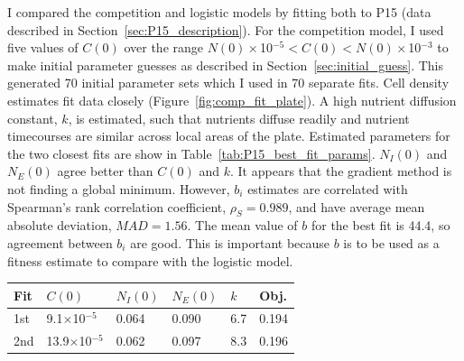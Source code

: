 I compared the competition and logistic models by fitting both to P15
(data described in Section~\ref{sec:P15_description}). For the
competition model, I used five values of \(C(0)\) over the range
\(N(0)\times\)10\(^{-5} < C(0) < N(0)\times\)10\(^{-3}\) to make
initial parameter guesses as described in
Section~\ref{sec:initial_guess}. This generated 70 initial parameter
sets which I used in 70 separate fits. Cell density estimates fit data
closely (Figure~\ref{fig:comp_fit_plate}).
A high nutrient diffusion constant, \(k\), is estimated, such that
nutrients diffuse readily and nutrient timecourses are similar across
local areas of the plate. Estimated parameters for the two closest
fits are show in Table~\ref{tab:P15_best_fit_params}. \(N_{I}(0)\) and
\(N_{E}(0)\) agree better than \(C(0)\) and \(k\). It appears that the
gradient method is not finding a global minimum. However, \(b_{i}\)
estimates are correlated with Spearman's rank correlation coefficient,
\(\rho_{S} = 0.989\), and have average mean absolute deviation,
\(MAD = 1.56\). The mean value of \(b\) for the best fit is 44.4, so
agreement between \(b_{i}\) are good. This is important because \(b\)
is to be used as a fitness estimate to compare with the logistic
model.
\begin{center}
  \begin{tabular}{l l l l l l}
    \hline
    Fit     & \(C(0)\)                    & \(N_{I}(0)\) & \(N_{E}(0)\) & \(k\) & Obj.\\
    \hline
    1st     & 9.1\(\times\)10\(^{-5}\)    & 0.064      & 0.090       & 6.7  & 0.194 \\
    2nd     & 13.9\(\times\)10\(^{-5}\)   & 0.062      & 0.097       & 8.3  & 0.196 \\
    \hline
  \end{tabular}
  \label{tab:P15_best_fit_params}
\end{center}

